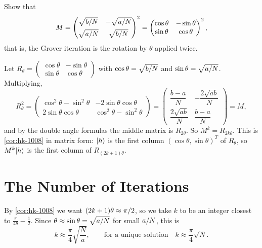 \begin{exercisebox}
\begin{exercise}\label{ex:msquare-1008}
    Show that
    \[M = \begin{pmatrix} \sqrt{b/N} & -\sqrt{a/N} \\[1ex] \sqrt{a/N} & \sqrt{b/N} \end{pmatrix}^{2}
        = \begin{pmatrix} \cos\theta & -\sin\theta \\ \sin\theta & \cos\theta \end{pmatrix}^{2},\]
    that is, the Grover iteration is the rotation by $\theta$ applied twice.
\end{exercise}
\tcblower
\begin{wsolution}
    Let $R_\theta = \left(\begin{smallmatrix} \cos\theta & -\sin\theta \\ \sin\theta & \cos\theta \end{smallmatrix}\right)$
    with $\cos\theta = \sqrt{b/N}$ and $\sin\theta = \sqrt{a/N}$. Multiplying,
    \[R_\theta^2
        = \begin{pmatrix} \cos^2\theta - \sin^2\theta & -2\sin\theta\cos\theta \\ 2\sin\theta\cos\theta & \cos^2\theta - \sin^2\theta \end{pmatrix}
        = \begin{pmatrix} \dfrac{b - a}{N} & -\dfrac{2\sqrt{ab}}{N} \\[2ex] \dfrac{2\sqrt{ab}}{N} & \dfrac{b - a}{N} \end{pmatrix} = M,\]
    and by the double angle formulas the middle matrix is $R_{2\theta}$. So $M^k = R_{2k\theta}$.
    This is \cref{cor:hk-1008} in matrix form: $\lvert h \rangle$ is the first column
    $(\cos\theta, \sin\theta)^T$ of $R_\theta$, so $M^k\lvert h \rangle$ is the first column of $R_{(2k+1)\theta}$.
\end{wsolution}
\end{exercisebox}

\section{The Number of Iterations}\label{sec:iterations-1008}

By \cref{cor:hk-1008} we want $(2k+1)\theta \approx \pi/2$, so we take $k$ to be an integer
closest to $\frac{\pi}{4\theta} - \frac{1}{2}$. Since $\theta \approx \sin\theta = \sqrt{a/N}$
for small $a/N$, this is
\[k \approx \frac{\pi}{4}\sqrt{\frac{N}{a}}, \qquad \text{for a unique solution} \quad k \approx \frac{\pi}{4}\sqrt{N}.\]

